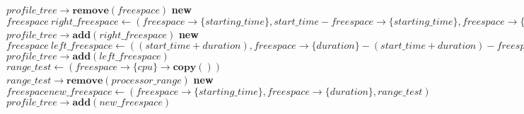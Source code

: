 \documentclass{report}
\begin{document}
\begin{algorithm}
\caption{Decoupage Freespace}\label{cut_freespace}
\begin{algorithmic}[1]
		\State $profile\_tree\rightarrow \textbf{remove}(freespace)$
		\State
			\State \textbf{new} $freespace\ right\_freespace\gets(freespace\rightarrow\{starting\_time\},start\_time - freespace\rightarrow\{starting\_time\}, freespace\rightarrow\{cpu\})$
			\State $profile\_tree\rightarrow \textbf{add}(right\_freespace)$
		\EndIf
		\State
			\State \textbf{new} $freespace\ left\_freespace\gets((start\_time + duration),freespace\rightarrow\{duration\} - (start\_time + duration) - freespace\rightarrow\{starting\_time\}, freespace\rightarrow\{cpu\})$
			\State $profile\_tree\rightarrow \textbf{add}(left\_freespace)$
		\EndIf
		\State
		\State $range\_test \gets (freespace\rightarrow\{cpu\}\rightarrow \textbf{copy}())$
		\State $range\_test\rightarrow \textbf{remove}(processor\_range)$
		\State		
			\State \textbf{new} $freespace new\_freespace\gets(freespace\rightarrow\{starting\_time\}, freespace\rightarrow\{duration\}, range\_test)$
			\State $profile\_tree\rightarrow \textbf{add}(new\_freespace)$
		\EndIf
		\State
	\EndIf
	\State
\EndFunction
\end{algorithmic}
\end{algorithm}
\end{document}
